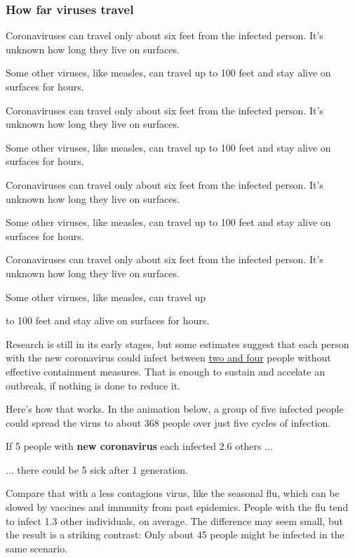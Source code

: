 \hypertarget{how-far-viruses-travel}{%
\subsubsection{How far viruses travel}\label{how-far-viruses-travel}}

Coronaviruses can travel only about six feet from the infected person.
It's unknown how long they live on surfaces.

Some other viruses, like measles, can travel up to 100 feet and stay
alive on surfaces for hours.

Coronaviruses can travel only about six feet from the infected person.
It's unknown how long they live on surfaces.

Some other viruses, like measles, can travel up to 100 feet and stay
alive on surfaces for hours.

Coronaviruses can travel only about six feet from the infected person.
It's unknown how long they live on surfaces.

Some other viruses, like measles, can travel up to 100 feet and stay
alive on surfaces for hours.

Coronaviruses can travel only about six feet from the infected person.
It's unknown how long they live on surfaces.

Some other viruses, like measles, can travel up

to 100 feet and stay alive on surfaces for hours.

Research is still in its early stages, but some estimates suggest that
each person with the new coronavirus could infect between
\href{https://academic.oup.com/jtm/advance-article/doi/10.1093/jtm/taaa021/5735319}{two
and four} people without effective containment measures. That is enough
to sustain and accelate an outbreak, if nothing is done to reduce it.

Here's how that works. In the animation below, a group of five infected
people could spread the virus to about 368 people over just five cycles
of infection.

If 5 people with \textbf{new coronavirus} each infected 2.6 others ...

... there could be 5 sick after 1 generation.

Compare that with a less contagious virus, like the seasonal flu, which
can be slowed by vaccines and immunity from past epidemics. People with
the flu tend to infect 1.3 other individuals, on average. The difference
may seem small, but the result is a striking contrast: Only about 45
people might be infected in the same scenario.

